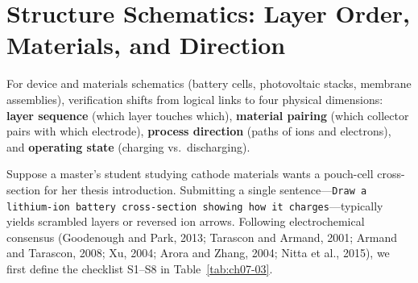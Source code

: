 \section{Structure Schematics: Layer Order, Materials, and Direction}

For device and materials schematics (battery cells, photovoltaic stacks, membrane assemblies), verification shifts from logical links to four physical dimensions: \textbf{layer sequence} (which layer touches which), \textbf{material pairing} (which collector pairs with which electrode), \textbf{process direction} (paths of ions and electrons), and \textbf{operating state} (charging vs.\ discharging).

Suppose a master's student studying cathode materials wants a pouch-cell cross-section for her thesis introduction. Submitting a single sentence---\texttt{Draw a lithium-ion battery cross-section showing how it charges}---typically yields scrambled layers or reversed ion arrows. Following electrochemical consensus (Goodenough and Park, 2013; Tarascon and Armand, 2001; Armand and Tarascon, 2008; Xu, 2004; Arora and Zhang, 2004; Nitta et al., 2015), we first define the checklist S1--S8 in Table~\ref{tab:ch07-03}.

